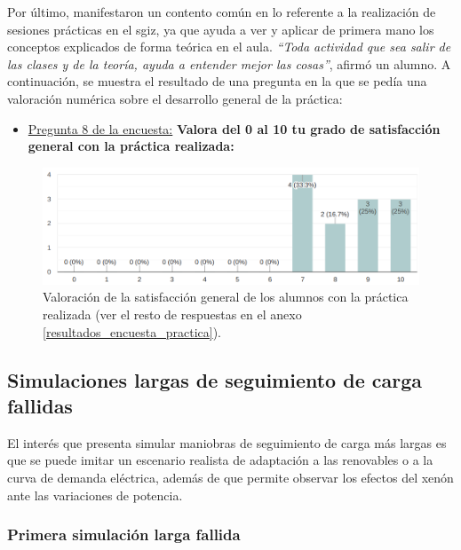 Por último, manifestaron un contento común en lo referente a la realización de sesiones prácticas en el \acrshort{sgiz}, ya que ayuda a ver y aplicar de primera mano los conceptos explicados de forma teórica en el aula. \textit{``Toda actividad que sea salir de las clases y de la teoría, ayuda a entender mejor las cosas''}, afirmó un alumno. A continuación, se muestra el resultado de una pregunta en la que se pedía una valoración numérica sobre el desarrollo general de la práctica:

\begin{itemize}
  \item \underline{Pregunta 8 de la encuesta:} \textbf{Valora del 0 al 10 tu grado de satisfacción general con la práctica realizada:}
\end{itemize}
   
    \begin{figure}[!h]
        \centering
        \includegraphics[width=\textwidth]{content/figures/encuesta_8.png}
        \caption{Valoración de la satisfacción general de los alumnos con la práctica realizada (ver el resto de respuestas en el anexo \ref{resultados_encuesta_practica}).}
        \label{fig:encuesta_8_memoria}
    \end{figure}


\newpage
\subsection{Simulaciones largas de seguimiento de carga fallidas}

El interés que presenta simular maniobras de seguimiento de carga más largas es que se puede imitar un escenario realista de adaptación a las renovables o a la curva de demanda eléctrica, además de que permite observar los efectos del xenón ante las variaciones de potencia.

\subsubsection{Primera simulación larga fallida}

